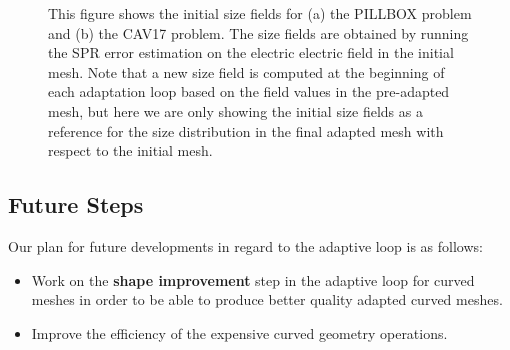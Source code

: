 \documentclass[review,12pt]{elsarticle_summary_report}
\begin{document}
\begin{figure}[ph!]
\centering
{}
\caption{\label{size_fields} This figure shows the initial size fields for (a) the PILLBOX problem and (b) the CAV17 problem. The size fields are obtained by running the SPR error estimation on the electric electric field in the initial mesh. Note that a new size field is computed at the beginning of each adaptation loop based on the field values in the pre-adapted mesh, but here we are only showing the initial size fields as a reference for the size distribution in the final adapted mesh with respect to the initial mesh.}
\end{figure}

\subsection{\label{adaptive_loop_future} Future Steps}

Our plan for future developments in regard to the adaptive loop is as follows:
\begin{itemize}
  \item Work on the \textbf{shape improvement} step in the adaptive loop for curved meshes in order to be able to produce better quality adapted curved meshes.
  \item Improve the efficiency of the expensive curved geometry operations.
\end{itemize}
\end{document}
